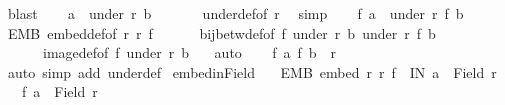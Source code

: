 \begin{isabellebody}
\ blast\isanewline
\ \ \isamarkupfalse%
\ {\isachardoublequoteopen}a\ {\isasymin}\ under\ r\ b{\isachardoublequoteclose}\isanewline
\ \ \ \ \isamarkupfalse%
\ {\isacharasterisk}{\kern0pt}\ under{\isacharunderscore}{\kern0pt}def{\isacharbrackleft}{\kern0pt}of\ r{\isacharbrackright}{\kern0pt}\ \isamarkupfalse%
\ simp\isanewline
\ \ \isamarkupfalse%
\ {\isachardoublequoteopen}f\ a\ {\isasymin}\ under\ r{\isacharprime}{\kern0pt}\ {\isacharparenleft}{\kern0pt}f\ b{\isacharparenright}{\kern0pt}{\isachardoublequoteclose}\isanewline
\ \ \ \ \isamarkupfalse%
\ EMB\ embed{\isacharunderscore}{\kern0pt}def{\isacharbrackleft}{\kern0pt}of\ r\ r{\isacharprime}{\kern0pt}\ f{\isacharbrackright}{\kern0pt}\isanewline
\ \ \ \ \ \ bij{\isacharunderscore}{\kern0pt}betw{\isacharunderscore}{\kern0pt}def{\isacharbrackleft}{\kern0pt}of\ f\ {\isachardoublequoteopen}under\ r\ b{\isachardoublequoteclose}\ {\isachardoublequoteopen}under\ r{\isacharprime}{\kern0pt}\ {\isacharparenleft}{\kern0pt}f\ b{\isacharparenright}{\kern0pt}{\isachardoublequoteclose}{\isacharbrackright}{\kern0pt}\isanewline
\ \ \ \ \ \ image{\isacharunderscore}{\kern0pt}def{\isacharbrackleft}{\kern0pt}of\ f\ {\isachardoublequoteopen}under\ r\ b{\isachardoublequoteclose}{\isacharbrackright}{\kern0pt}\ {}\ \isamarkupfalse%
\ auto\isanewline
\ \ \isamarkupfalse%
\ {\isachardoublequoteopen}{\isacharparenleft}{\kern0pt}f\ a{\isacharcomma}{\kern0pt}\ f\ b{\isacharparenright}{\kern0pt}\ {\isasymin}\ r{\isacharprime}{\kern0pt}{\isachardoublequoteclose}\isanewline
\ \ \ \ \isamarkupfalse%
\ {\isacharparenleft}{\kern0pt}auto\ simp\ add{\isacharcolon}{\kern0pt}\ under{\isacharunderscore}{\kern0pt}def{\isacharparenright}{\kern0pt}\isanewline
{}\isamarkupfalse%
%
\endisatagproof
{\isafoldproof}%
%
\isadelimproof
\isanewline
%
\endisadelimproof
\isanewline
{}\isamarkupfalse%
\ embed{\isacharunderscore}{\kern0pt}in{\isacharunderscore}{\kern0pt}Field{\isacharcolon}{\kern0pt}\isanewline
\ \ \ EMB{\isacharcolon}{\kern0pt}\ {\isachardoublequoteopen}embed\ r\ r{\isacharprime}{\kern0pt}\ f{\isachardoublequoteclose}\ \ IN{\isacharcolon}{\kern0pt}\ {\isachardoublequoteopen}a\ {\isasymin}\ Field\ r{\isachardoublequoteclose}\isanewline
\ \ \ {\isachardoublequoteopen}f\ a\ {\isasymin}\ Field\ r{\isacharprime}{\kern0pt}{\isachardoublequoteclose}\isanewline
%
\isadelimproof
%
\endisadelimproof
%
\isatagproof
{}\isamarkupfalse%

\end{isabellebody}
